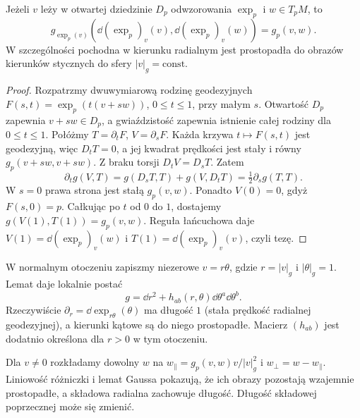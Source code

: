 \begin{lemat}[Gaussa]
\label{lem:gaussa-exp}
Jeżeli $v$ leży w otwartej dziedzinie $D_p$ odwzorowania
$\exp_p$ i
$w\in T_pM$, to
\begin{equation}\label{eq:lemat-gaussa}
 g_{\exp_p(v)}\!\left(
   \dd(\exp_p)_v(v),\dd(\exp_p)_v(w)\right)
   =g_p(v,w).
\end{equation}
W szczególności pochodna w kierunku radialnym
jest prostopadła do obrazów kierunków
stycznych do sfery $|v|_g=\mathrm{const}$.
\end{lemat}
\begin{proof}
Rozpatrzmy dwuwymiarową rodzinę geodezyjnych
$F(s,t)=\exp_p(t(v+sw))$, $0\leq t\leq1$,
przy małym $s$. Otwartość $D_p$ zapewnia $v+sw\in D_p$,
a gwiaździstość zapewnia istnienie całej rodziny
dla $0\leq t\leq1$. Połóżmy
$T=\partial_tF$, $V=\partial_sF$.
Każda krzywa $t\mapsto F(s,t)$ jest geodezyjną,
więc $D_tT=0$, a jej kwadrat prędkości
jest stały i równy $g_p(v+sw,v+sw)$.
Z braku torsji $D_tV=D_sT$. Zatem
\[
 \partial_t g(V,T)
 =g(D_sT,T)+g(V,D_tT)
 =\tfrac12\partial_s g(T,T).
\]
W $s=0$ prawa strona jest stałą $g_p(v,w)$.
Ponadto $V(0)=0$, gdyż $F(s,0)=p$.
Całkując po $t$ od $0$ do $1$, dostajemy
$g(V(1),T(1))=g_p(v,w)$.
Reguła łańcuchowa daje
$V(1)=\dd(\exp_p)_v(w)$ i
$T(1)=\dd(\exp_p)_v(v)$, czyli tezę.
\end{proof}

W normalnym otoczeniu zapiszmy niezerowe
$v=r\theta$, gdzie $r=|v|_g$ i
$|\theta|_g=1$. Lemat daje lokalnie postać
\begin{equation}\label{eq:metryka-biegunowo-normalna}
 g=\dd r^2+h_{ab}(r,\theta)
                 \dd\theta^a\dd\theta^b.
\end{equation}
Rzeczywiście $\partial_r=\dd\exp_{r\theta}(\theta)$
ma długość $1$ (stała prędkość radialnej
geodezyjnej), a kierunki kątowe są do niego
prostopadłe. Macierz $(h_{ab})$ jest dodatnio
określona dla $r>0$ w tym otoczeniu.

Dla $v\ne0$ rozkładamy dowolny $w$ na
$w_\parallel=g_p(v,w)v/|v|_g^2$ i
$w_\perp=w-w_\parallel$.
Liniowość różniczki i lemat Gaussa pokazują, że ich obrazy
pozostają wzajemnie prostopadłe, a składowa radialna
zachowuje długość. Długość składowej poprzecznej może się zmienić.

